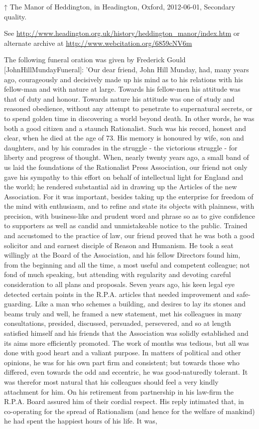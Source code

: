     
    ↑ The Manor of Heddington, in Headington, Oxford, 2012-06-01, Secondary quality.

    See \url{http://www.headington.org.uk/history/heddington_manor/index.htm} or alternate archive at \url{http://www.webcitation.org/6859cNV6m}
  

    
    
 The following funeral oration was given by Frederick Gould [JohnHillMundayFuneral]:
    'Our dear friend, John Hill Munday, had, many years ago, courageously and decisively made up his mind as to his relations with his fellow-man and with nature at large. Towards his fellow-men his attitude was that of duty and honour. Towards nature his attitude was one of study and reasoned obedience, without any attempt to penetrate to supernatural secrets, or to spend golden time in discovering a world beyond death. In other words, he was both a good citizen and a staunch Rationalist. Such was his record, honest and clear, when he died at the age of 73. His memory is honoured by wife, son and daughters, and by his comrades in the struggle - the victorious struggle - for liberty and progress of thought. When, nearly twenty years ago, a small band of us laid the foundations of the Rationalist Press Association, our friend not only gave his sympathy to this effort on behalf of intellectual light for England and the world; he rendered substantial aid in drawing up the Articles of the new Association. For it was important, besides taking up the enterprise for freedom of the mind with enthusiasm, and to refine and state its objects with plainness, with precision, with business-like and prudent word and phrase so as to give confidence to supporters as well as candid and unmistakeable notice to the public. Trained and accustomed to the practice of law, our friend proved that he was both a good solicitor and and earnest disciple of Reason and Humanism. He took a seat willingly at the Board of the Association, and his fellow Directors found him, from the beginning and all the time, a most useful and competent colleague; not fond of much speaking, but attending with regularity and devoting careful consideration to all plans and proposals. Seven years ago, his keen legal eye detected certain points in the R.P.A. articles that needed improvement and safe-guarding. Like a man who schemes a building, and desires to lay its stones and beams truly and well, he framed a new statement, met his colleagues in many consultations, presided, discussed, persuaded, persevered, and so at length satisfied himself and his friends that the Association was solidly established and its aims more efficiently promoted. The work of months was tedious, but all was done with good heart and a valiant purpose. In matters of political and other opinions, he was for his own part firm and consistent; but towards those who differed, even towards the odd and eccentric, he was good-naturedly tolerant. It was therefor most natural that his colleagues should feel a very kindly attachment for him. On his retirement from partnership in his law-firm the R.P.A. Board assured him of their cordial respect. His reply intimated that, in co-operating for the spread of Rationalism (and hence for the welfare of mankind) he had spent the happiest hours of his life. It was, 